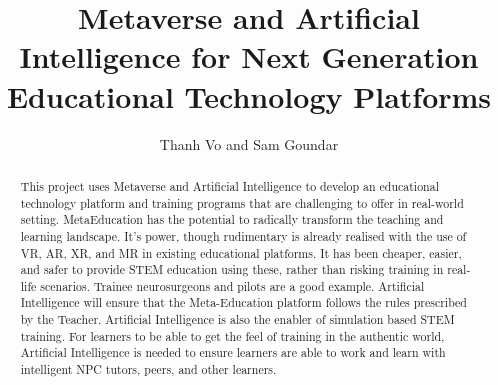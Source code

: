 \documentclass[
    ngerman,american
    ]{scrartcl}
\title{
         Metaverse and Artificial Intelligence for Next Generation Educational Technology Platforms        
    }
\author {
        Thanh Vo and Sam Goundar   
    }
\begin{document}
      \maketitle
        \begin{abstract}
         
         This project uses Metaverse and Artificial Intelligence to develop an educational technology
	platform and training programs that are challenging to offer in real-world setting. 
	MetaEducation has the potential to radically transform the teaching and learning landscape. It’s
	power, though rudimentary is already realised with the use of VR, AR, XR, and MR in existing
	educational platforms. It has been cheaper, easier, and safer to provide STEM education using
	these, rather than risking training in real-life scenarios. Trainee neurosurgeons and pilots are a
	good example. Artificial Intelligence will ensure that the Meta-Education platform follows the
	rules prescribed by the Teacher. Artificial Intelligence is also the enabler of simulation based
	STEM training. For learners to be able to get the feel of training in the authentic world, Artificial
	Intelligence is needed to ensure learners are able to work and learn with intelligent NPC tutors,
	peers, and other learners.

        \end{abstract}
        
        
\end{document}
